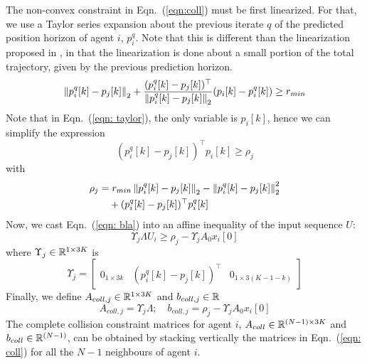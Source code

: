 The non-convex constraint in Eqn.~(\ref{eqn:coll}) must be first linearized. For that, we use a Taylor series expansion about the previous iterate $q$ of the predicted position horizon of agent $i$, $p_i^q$. Note that this is different than the linearization proposed in \cite{chen2015decoupled}, in that the linearization is done about a small portion of the total trajectory, given by the previous prediction horizon.
\begin{equation}
\label{eqn: taylor}
\left\Vert p^q_i[k] - p_j[k]\right\Vert_2 + \frac{(p_i^q[k]-p_j[k])^\top}{\left\Vert p^q_i[k] - p_j[k]\right\Vert_2}(p_i[k]-p_i^q[k]) \geq r_{min}
\end{equation}
Note that in Eqn.~(\ref{eqn: taylor}), the only variable is $p_i[k]$, hence we can simplify the expression
\begin{equation}
\label{eqn: bla}
(p_i^q[k]-p_j[k])^\top p_i[k] \geq \rho_j
\end{equation}
with
\begin{equation}
\begin{aligned}
\rho_j &= r_{min}\left\Vert p^q_i[k] - p_j[k]\right\Vert_2 - \left\Vert p^q_i[k] - p_j[k]\right\Vert_2^2 \\
& \hspace{1em}+ (p_i^q[k]-p_j[k])^\top p^q_i[k]
\end{aligned}
\end{equation}
Now, we cast Eqn.~(\ref{eqn: bla}) into an affine inequality of the input sequence $U$:
\begin{equation}
\Upsilon_j \Lambda U_i \geq \rho_j - \Upsilon_j A_0 x_i[0]
\end{equation}
where $\Upsilon_j \in {\mathbb R}^{1 \times 3K}$ is
\begin{equation}
\Upsilon_j = \begin{bmatrix}
0_{1\times 3k} & (p_i^q[k]-p_j[k])^\top & 0_{1 \times 3(K-1-k)}
\end{bmatrix}
\end{equation}
Finally, we define $A_{coll,j} \in {\mathbb R}^{1 \times 3K}$ and $b_{coll,j} \in {\mathbb R}$
\begin{equation}
\label{eqn: coll}
A_{coll,j} = \Upsilon_j \Lambda ; \quad b_{coll,j} = \rho_j - \Upsilon_j A_0 x_i[0]
\end{equation}
The complete collision constraint matrices for agent $i$, $A_{coll} \in {\mathbb R}^{(N-1) \times 3K}$ and $b_{coll} \in {\mathbb R}^{(N-1)}$, can be obtained by stacking vertically the matrices in Eqn.~(\ref{eqn: coll}) for all the $N-1$ neighbours of agent $i$.


